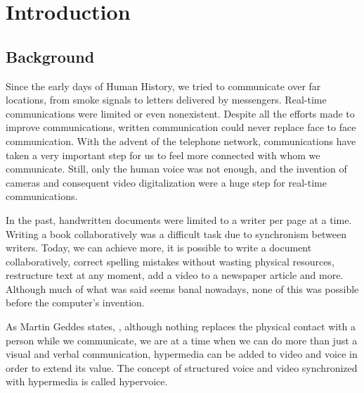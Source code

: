 \chapter{Introduction}
\label{chapter:introduction}

\section{Background}
\label{section:background}

	Since the early days of Human History, we tried to communicate over far locations, from smoke signals to letters delivered by messengers. Real-time communications were limited or even nonexistent. Despite all the efforts made to improve communications, written communication could never replace face to face communication.
	With the advent of the telephone network, communications have taken a very important step for us to feel more connected with whom we communicate. Still, only the human voice was not enough, and the invention of cameras and consequent video digitalization were a huge step for real-time communications.

	In the past, handwritten documents were limited to a writer per page at a time. Writing a book collaboratively was a difficult task due to synchronism between writers.
	Today, we can achieve more, it is possible to write a document collaboratively, correct spelling mistakes without wasting physical resources, restructure text at any moment, add a video to a newspaper article and more. Although much of what was said seems banal nowadays, none of this was possible before the computer's invention. 

	As Martin Geddes states\cite{geddes},  , although nothing replaces the physical contact with a person while we communicate, we are at a time when we can do more than just a visual and verbal communication, hypermedia can be added to video and voice in order to extend its value. The concept of structured voice and video synchronized with hypermedia is called hypervoice\cite{geddes}.


